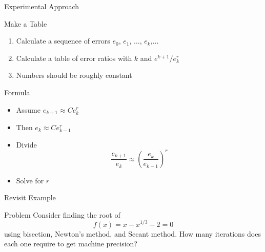 \documentclass[10pt]{beamer}
\begin{document}
\begin{frame}{Experimental Approach}

\begin{block}{Make a Table}
    
\begin{enumerate}
    \item Calculate a sequence of errors $e_0$, $e_1$, $\dots$, $e_k$,$\dots$

    \item Calculate a table of error ratios with $k$ and $e^{k+1}/e_{k}^r$

    \item Numbers should be roughly constant
\end{enumerate}
\end{block}


\begin{block}{Formula}
\begin{itemize}
    \item Assume $e_{k+1}\approx Ce_{k}^r$
    \item Then $e_{k}\approx Ce_{k-1}^r$
    \item Divide 
    $$
     \frac{e_{k+1}}{e_k} \approx \left(\frac{e_k}{e_{k-1}}\right)^r
    $$
    \item Solve for $r$
\end{itemize}

    
\end{block}

    

    
\end{frame}


\begin{frame}{Revisit Example}


    \begin{block}{Problem}
    Consider finding the root of 
        \begin{equation*}
   f(x) = x - x^{1/3} - 2 = 0
\end{equation*}
    using bisection, Newton's method, and Secant method. How many iterations does each one require to get machine precision?
    \end{block}

\end{frame}
\end{document}
